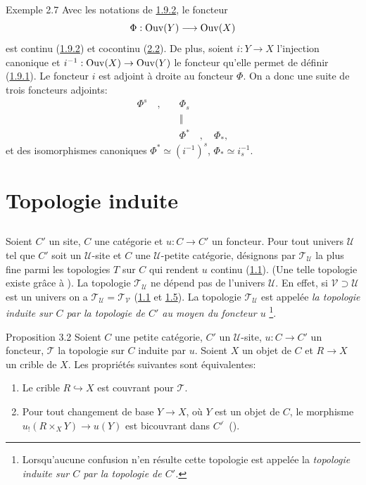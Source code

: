 \documentclass[10pt]{../fichiers-configuration-latex/smfart}
\begin{document}
\begin{enonce*}[remark]{Exemple 2.7}
Avec les notations de \hyperref[III.exem1.9.2]{1.9.2}, le foncteur
$$
\Phi:\operatorname{Ouv}(Y)\longrightarrow \operatorname{Ouv}(X)
$$
est continu (\hyperref[III.exem1.9.2]{1.9.2}) et cocontinu (\hyperref[III.prop2.2]{2.2}).
De plus, soient $i:Y\rightarrow X$ l'injection\pageoriginale
canonique et $i^{-1}:\operatorname{Ouv}(X)\rightarrow \operatorname{Ouv}(Y)$ le foncteur qu'elle
permet de définir (\hyperref[III.exem1.9.1]{1.9.1}). Le foncteur $i$ est
adjoint à droite au foncteur $\Phi$. On a donc une suite de trois
foncteurs adjoints:
\begin{align*}
\Phi^s\quad ,\quad & \Phi_s\\
        & ‖\\
        &\Phi^{\ast}\quad,\quad \Phi_{\ast},
\end{align*}
et des isomorphismes canoniques $\Phi^{\ast}\simeq (i^{-1})^s$,
$\Phi_{\ast}\simeq i^{-1}_s$.
\end{enonce*}

\section{Topologie induite}

\subsection{}
Soient $C'$ un site, $C$ une catégorie et $u:C\rightarrow C'$ un
foncteur. Pour tout univers $𝒰$ tel que $C'$ soit un
$𝒰$-site et $C$ une $𝒰$-petite catégorie, désignons
par $𝒯_{𝒰}$ la plus fine parmi les topologies $T$ sur $C$
qui rendent $u$ continu (\hyperref[III.def1.1]{1.1}). (Une telle topologie
existe grâce à ). La topologie $𝒯_{𝒰}$ ne
dépend pas de l'univers $𝒰$. En effet, si $𝒱\supset
𝒰$ est un univers on a $𝒯_{𝒰}=𝒯_{𝒱}$
(\hyperref[III.def1.1]{1.1} et \hyperref[III.prop1.5]{1.5}). La topologie
$𝒯_{𝒰}$ est appelée \emph{la topologie
  induite sur $C$ par la topologie de $C'$ au moyen du foncteur $u$}
  \footnote[1]{Lorsqu'aucune confusion n'en résulte cette topologie
    est appelée la \emph{topologie induite sur $C$ par la topologie
      de $C'$.}}.

\begin{enonce*}{Proposition 3.2}
Soient $C$ une petite catégorie, $C'$ un $𝒰$-site,
$u:C\rightarrow C'$ un foncteur, $𝒯$ la topologie sur $C$ induite
par $u$. Soient $X$ un objet de $C$ et $R\rightarrow X$ un crible de
$X$. Les propriétés suivantes sont équivalentes:
\begin{enumerate}
\renewcommand{\theenumi}{\roman{enumi}}
\renewcommand{\labelenumi}{\theenumi)}
\item Le crible $R\hookrightarrow X$ est couvrant pour $𝒯$.

\item Pour tout changement de base $Y\rightarrow X$, où $Y$ est un
  objet de $C$, le morphisme $u_{!}(R\times_X Y)\rightarrow u(Y)$ est
  bicouvrant dans ${C'}^{\widehat{\phantom{,}}}$ {\rm ().}
\end{enumerate}
\end{enonce*}
\end{document}
